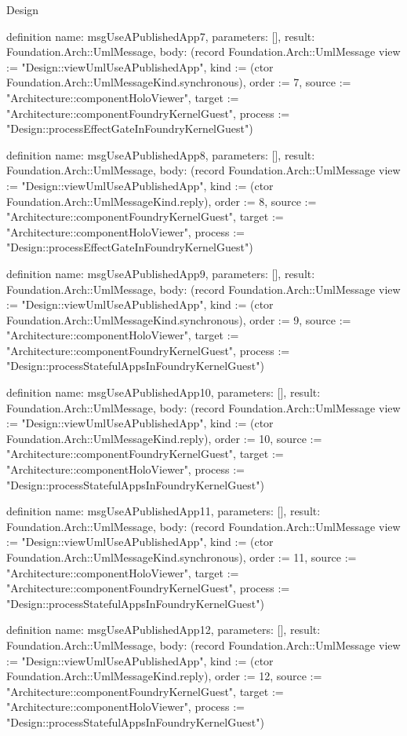 \begin{lexlean}{Design}
\begin{semanticmodule}
definition{
  name: msgUseAPublishedApp7,
  parameters: [],
  result: Foundation.Arch::UmlMessage,
  body: (record Foundation.Arch::UmlMessage {view := "Design::viewUmlUseAPublishedApp", kind := (ctor Foundation.Arch::UmlMessageKind.synchronous), order := 7, source := "Architecture::componentHoloViewer", target := "Architecture::componentFoundryKernelGuest", process := "Design::processEffectGateInFoundryKernelGuest"})
}

definition{
  name: msgUseAPublishedApp8,
  parameters: [],
  result: Foundation.Arch::UmlMessage,
  body: (record Foundation.Arch::UmlMessage {view := "Design::viewUmlUseAPublishedApp", kind := (ctor Foundation.Arch::UmlMessageKind.reply), order := 8, source := "Architecture::componentFoundryKernelGuest", target := "Architecture::componentHoloViewer", process := "Design::processEffectGateInFoundryKernelGuest"})
}

definition{
  name: msgUseAPublishedApp9,
  parameters: [],
  result: Foundation.Arch::UmlMessage,
  body: (record Foundation.Arch::UmlMessage {view := "Design::viewUmlUseAPublishedApp", kind := (ctor Foundation.Arch::UmlMessageKind.synchronous), order := 9, source := "Architecture::componentHoloViewer", target := "Architecture::componentFoundryKernelGuest", process := "Design::processStatefulAppsInFoundryKernelGuest"})
}

definition{
  name: msgUseAPublishedApp10,
  parameters: [],
  result: Foundation.Arch::UmlMessage,
  body: (record Foundation.Arch::UmlMessage {view := "Design::viewUmlUseAPublishedApp", kind := (ctor Foundation.Arch::UmlMessageKind.reply), order := 10, source := "Architecture::componentFoundryKernelGuest", target := "Architecture::componentHoloViewer", process := "Design::processStatefulAppsInFoundryKernelGuest"})
}

definition{
  name: msgUseAPublishedApp11,
  parameters: [],
  result: Foundation.Arch::UmlMessage,
  body: (record Foundation.Arch::UmlMessage {view := "Design::viewUmlUseAPublishedApp", kind := (ctor Foundation.Arch::UmlMessageKind.synchronous), order := 11, source := "Architecture::componentHoloViewer", target := "Architecture::componentFoundryKernelGuest", process := "Design::processStatefulAppsInFoundryKernelGuest"})
}

definition{
  name: msgUseAPublishedApp12,
  parameters: [],
  result: Foundation.Arch::UmlMessage,
  body: (record Foundation.Arch::UmlMessage {view := "Design::viewUmlUseAPublishedApp", kind := (ctor Foundation.Arch::UmlMessageKind.reply), order := 12, source := "Architecture::componentFoundryKernelGuest", target := "Architecture::componentHoloViewer", process := "Design::processStatefulAppsInFoundryKernelGuest"})
}


\end{semanticmodule}
\end{lexlean}
